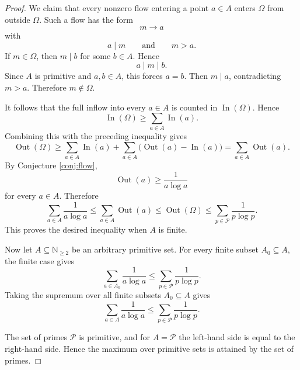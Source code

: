 \documentclass{amsart}
\newcommand{\N}{\mathbb N}
\newcommand{\Pp}{\mathcal P}
\begin{document}
\begin{proof}
We claim that every nonzero flow entering a point \(a\in A\) enters \(\Omega\) from outside \(\Omega\).  Such a flow has the form
\[
m\longrightarrow a
\]
with
\[
a\mid m
\qquad\text{and}\qquad
m>a.
\]
If \(m\in\Omega\), then \(m\mid b\) for some \(b\in A\).  Hence
\[
a\mid m\mid b.
\]
Since \(A\) is primitive and \(a,b\in A\), this forces \(a=b\).  Then \(m\mid a\), contradicting \(m>a\).  Therefore \(m\notin\Omega\).

It follows that the full inflow into every \(a\in A\) is counted in \(\operatorname{In}(\Omega)\).  Hence
\[
\operatorname{In}(\Omega)
\geq
\sum_{a\in A}\operatorname{In}(a).
\]
Combining this with the preceding inequality gives
\[
\operatorname{Out}(\Omega)
\geq
\sum_{a\in A}\operatorname{In}(a)
+
\sum_{a\in A}
\bigl(\operatorname{Out}(a)-\operatorname{In}(a)\bigr)
=
\sum_{a\in A}\operatorname{Out}(a).
\]
By Conjecture \ref{conj:flow},
\[
\operatorname{Out}(a)\geq \frac{1}{a\log a}
\]
for every \(a\in A\).  Therefore
\[
\sum_{a\in A}\frac{1}{a\log a}
\leq
\sum_{a\in A}\operatorname{Out}(a)
\leq
\operatorname{Out}(\Omega)
\leq
\sum_{p\in\Pp}\frac{1}{p\log p}.
\]
This proves the desired inequality when \(A\) is finite.

Now let \(A\subseteq\N_{\geq 2}\) be an arbitrary primitive set.  For every finite subset \(A_0\subseteq A\), the finite case gives
\[
\sum_{a\in A_0}\frac{1}{a\log a}
\leq
\sum_{p\in\Pp}\frac{1}{p\log p}.
\]
Taking the supremum over all finite subsets \(A_0\subseteq A\) gives
\[
\sum_{a\in A}\frac{1}{a\log a}
\leq
\sum_{p\in\Pp}\frac{1}{p\log p}.
\]

The set of primes \(\Pp\) is primitive, and for \(A=\Pp\) the left-hand side is equal to the right-hand side.  Hence the maximum over primitive sets is attained by the set of primes.
\end{proof}
\end{document}
